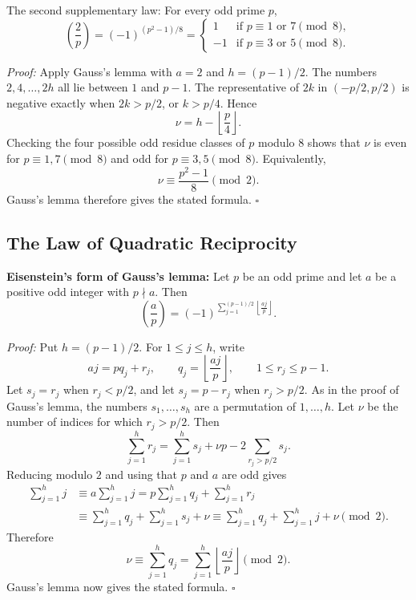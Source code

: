 \documentclass[a4paper,11pt,abstracton]{scrartcl}
\theoremstyle{dotlessP}
\theoremstyle{dotlessS}
\theoremstyle{remark}
\theoremstyle{definition}
\begin{document}
\begin{mainbox}{The second supplementary law:}
For every odd prime $p$,
\[
    \boxed{\left(\frac2p\right)=(-1)^{(p^2-1)/8}}
      =
      \begin{cases}
          1  & \text{if $p\equiv1$ or $7\pmod8$},\\
         -1  & \text{if $p\equiv3$ or $5\pmod8$}.
      \end{cases}
\]
\end{mainbox}

\begin{claim_box}
\textit{Proof:}
Apply Gauss's lemma with $a=2$ and $h=(p-1)/2$. The numbers
$2,4,\ldots,2h$ all lie between $1$ and $p-1$. The representative
of $2k$ in $(-p/2,p/2)$ is negative exactly when $2k>p/2$, or
$k>p/4$. Hence
\[
    \nu=h-\left\lfloor\frac p4\right\rfloor.
\]
Checking the four possible odd residue classes of $p$ modulo $8$
shows that $\nu$ is even for $p\equiv1,7\pmod8$ and odd for
$p\equiv3,5\pmod8$. Equivalently,
\[
    \nu\equiv\frac{p^2-1}{8}\pmod2.
\]
Gauss's lemma therefore gives the stated formula.
\hfill$\square$
\end{claim_box}

\subsection{The Law of Quadratic Reciprocity}

\begin{remark_box}
\textbf{Eisenstein's form of Gauss's lemma:}
Let $p$ be an odd prime and let $a$ be a positive odd integer with
$p\nmid a$. Then
\[
    \boxed{\left(\frac ap\right)
      =(-1)^{\displaystyle
        \sum_{j=1}^{(p-1)/2}\left\lfloor\frac{aj}{p}\right\rfloor}.}
\]
\end{remark_box}

\begin{claim_box}
\textit{Proof:}
Put $h=(p-1)/2$. For $1\leq j\leq h$, write
\[
    aj=pq_j+r_j,
    \qquad
    q_j=\left\lfloor\frac{aj}{p}\right\rfloor,
    \qquad 1\leq r_j\leq p-1.
\]
Let $s_j=r_j$ when $r_j<p/2$, and let $s_j=p-r_j$ when
$r_j>p/2$. As in the proof of Gauss's lemma, the numbers
$s_1,\ldots,s_h$ are a permutation of $1,\ldots,h$.
Let $\nu$ be the number of indices for which $r_j>p/2$. Then
\[
    \sum_{j=1}^{h}r_j
      =\sum_{j=1}^{h}s_j+\nu p
       -2\sum_{r_j>p/2}s_j.
\]
Reducing modulo $2$ and using that $p$ and $a$ are odd gives
\begin{align*}
    \sum_{j=1}^{h}j
      &\equiv a\sum_{j=1}^{h}j
       =p\sum_{j=1}^{h}q_j+\sum_{j=1}^{h}r_j\\
      &\equiv\sum_{j=1}^{h}q_j
        +\sum_{j=1}^{h}s_j+\nu
       \equiv\sum_{j=1}^{h}q_j
        +\sum_{j=1}^{h}j+\nu\pmod2.
\end{align*}
Therefore
\[
    \nu\equiv\sum_{j=1}^{h}q_j
      =\sum_{j=1}^{h}\left\lfloor\frac{aj}{p}\right\rfloor
      \pmod2.
\]
Gauss's lemma now gives the stated formula.
\hfill$\square$
\end{claim_box}
\end{document}
